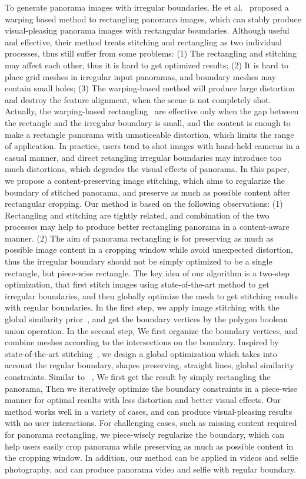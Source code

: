 \documentclass[10pt,journal,compsoc]{IEEEtran}
\begin{document}
To generate panorama images with irregular boundaries, He et al.~\cite{journals/tog/HeC013} proposed a warping based method to rectangling panorama images, which can stably produce visual-pleasing panorama images with rectangular boundaries.
Although useful and effective, their method treats stitching and rectangling as two individual processes, thus still suffer from some problems: (1) The rectangling and stitching may affect each other, thus it is hard to get optimized results; (2) It is hard to place grid meshes in irregular input panoramas, and boundary meshes may contain small holes; (3) The warping-based method will produce large distortion and destroy the feature alignment, when the scene is not completely shot.
Actually, the warping-based rectangling~\cite{journals/tog/HeC013} are effective only when the gap between the rectangle and the irregular boundary is small, and the content is enough to make a rectangle panorama with unnoticeable distortion, which limits the range of application.
In practice, users tend to shot images with hand-held cameras in a casual manner, and direct retangling irregular boundaries may introduce too much distortions, which degrades the visual effects of panorama.
In this paper, we propose a content-preserving image stitching, which aims to regularize the boundary of stitched panorama, and preserve as much as possible content after rectangular cropping. Our method is based on the following observations:
(1) Rectangling and stitching are tightly related, and combination of the two processes may help to produce better rectangling panorama in a content-aware manner.
(2) The aim of panorama rectangling is for preserving as much as possible image content in a cropping window while avoid unexpected distortion, thus the irregular boundary should not be simply optimized to be a single rectangle, but piece-wise rectangle.
The key idea of our algorithm is a two-step optimization, that first stitch images using state-of-the-art method to get irregular boundaries, and then globally optimize the mesh to get stitching results with regular boundaries.
In the first step, we apply image stitching with the global similarity prior~\cite{conf/eccv/ChenC16}, and get the boundary vertices by the polygon boolean union operation.
In the second step, We first organize the boundary vertices, and combine meshes according to the intersections on the boundary.
Inspired by state-of-the-art stitching~\cite{conf/eccv/ChenC16}, we design a  global optimization which takes into account the regular boundary, shapes preserving, straight lines, global similarity constraints.
Similar to ~\cite{journals/tog/HeC013}, We first get the result by simply rectangling the panorama, Then we iteratively optimize the boundary constraints in a piece-wise manner for optimal results with less distortion and better visual effects.
Our method works well in a variety of cases, and can produce visual-pleasing results with no user interactions.
For challenging cases, such as missing content required for panorama rectangling, we piece-wisely regularize the boundary, which can help users easily crop panorama while preserving as much as possible content in the cropping window.
In addition, our method can be applied in videos and selfie photography, and can produce panorama video and selfie with regular boundary.
\end{document}
